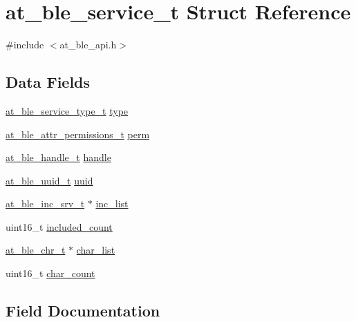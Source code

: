 \hypertarget{structat__ble__service__t}{}\section{at\+\_\+ble\+\_\+service\+\_\+t Struct Reference}
\label{structat__ble__service__t}


{\ttfamily \#include $<$at\+\_\+ble\+\_\+api.\+h$>$}

\subsection*{Data Fields}
\begin{DoxyCompactItemize}
\item 
\mbox{\hyperlink{at__ble__api_8h_ac5ab059831d8b9a79858a0a3d9abc145}{at\+\_\+ble\+\_\+service\+\_\+type\+\_\+t}} \mbox{\hyperlink{structat__ble__service__t_adbc5707f6d03660b83675c8568bd77b9}{type}}
\item 
\mbox{\hyperlink{at__ble__api_8h_a5d87cd231ea3f9e11846dba7cf75eb61}{at\+\_\+ble\+\_\+attr\+\_\+permissions\+\_\+t}} \mbox{\hyperlink{structat__ble__service__t_a339b801a3a93cf9055c72ff39b60472a}{perm}}
\item 
\mbox{\hyperlink{at__ble__api_8h_abd23646d0c662860741f787efc8456f2}{at\+\_\+ble\+\_\+handle\+\_\+t}} \mbox{\hyperlink{structat__ble__service__t_ab8b0f353cb6a8d85f0822900e3b7cf35}{handle}}
\item 
\mbox{\hyperlink{structat__ble__uuid__t}{at\+\_\+ble\+\_\+uuid\+\_\+t}} \mbox{\hyperlink{structat__ble__service__t_a679a8e56540040619aee07eb7a743859}{uuid}}
\item 
\mbox{\hyperlink{structat__ble__inc__srv__t}{at\+\_\+ble\+\_\+inc\+\_\+srv\+\_\+t}} $\ast$ \mbox{\hyperlink{structat__ble__service__t_a01f426836c2ee7bccccd143251c2e50b}{inc\+\_\+list}}
\item 
uint16\+\_\+t \mbox{\hyperlink{structat__ble__service__t_a9bf2360c8d73d6f4d11dc6786e1f3dbe}{included\+\_\+count}}
\item 
\mbox{\hyperlink{structat__ble__chr__t}{at\+\_\+ble\+\_\+chr\+\_\+t}} $\ast$ \mbox{\hyperlink{structat__ble__service__t_ae3d13ae15c8cb03068bb99f2e4b99fd8}{char\+\_\+list}}
\item 
uint16\+\_\+t \mbox{\hyperlink{structat__ble__service__t_ae6df3a5dea80c5d4fbad66d9b14a5749}{char\+\_\+count}}
\end{DoxyCompactItemize}


\subsection{Field Documentation}
\mbox{\label{structat__ble__service__t_ae6df3a5dea80c5d4fbad66d9b14a5749}} 

